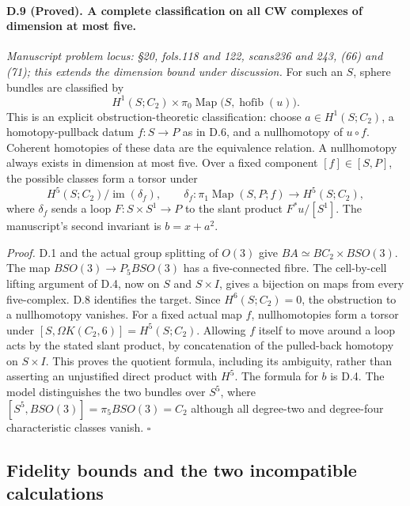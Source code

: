 \paragraph{D.9 (Proved). A complete classification on all CW complexes of dimension at most five.}
\emph{Manuscript problem locus: \S20, fols.118 and 122, scans236 and 243, (66) and (71); this extends the dimension bound under discussion.}
For such an $S$, sphere bundles are classified by
\[
H^1(S;C_2)\times
\pi_0\operatorname{Map}\bigl(S,\operatorname{hofib}(u)\bigr).
\]
This is an explicit obstruction-theoretic classification: choose $a\in H^1(S;C_2)$, a homotopy-pullback datum $f:S\to P$ as in D.6, and a nullhomotopy of $u\circ f$. Coherent homotopies of these data are the equivalence relation. A nullhomotopy always exists in dimension at most five. Over a fixed component $[f]\in[S,P]$, the possible classes form a torsor under
\[
H^5(S;C_2)\big/\operatorname{im}(\delta_f),\qquad
\delta_f:\pi_1\operatorname{Map}(S,P;f)\longrightarrow H^5(S;C_2),
\]
where $\delta_f$ sends a loop $F:S\times S^1\to P$ to the slant product $F^*u/[S^1]$. The manuscript's second invariant is $b=x+a^2$.

\emph{Proof.} D.1 and the actual group splitting of $O(3)$ give $BA\simeq BC_2\times BSO(3)$. The map $BSO(3)\to P_5BSO(3)$ has a five-connected fibre. The cell-by-cell lifting argument of D.4, now on $S$ and $S\times I$, gives a bijection on maps from every five-complex. D.8 identifies the target. Since $H^6(S;C_2)=0$, the obstruction to a nullhomotopy vanishes. For a fixed actual map $f$, nullhomotopies form a torsor under $[S,\Omega K(C_2,6)]=H^5(S;C_2)$. Allowing $f$ itself to move around a loop acts by the stated slant product, by concatenation of the pulled-back homotopy on $S\times I$. This proves the quotient formula, including its ambiguity, rather than asserting an unjustified direct product with $H^5$. The formula for $b$ is D.4. The model distinguishes the two bundles over $S^5$, where $[S^5,BSO(3)]=\pi_5BSO(3)=C_2$ although all degree-two and degree-four characteristic classes vanish. \hfill$\square$

\subsection{Fidelity bounds and the two incompatible calculations}

